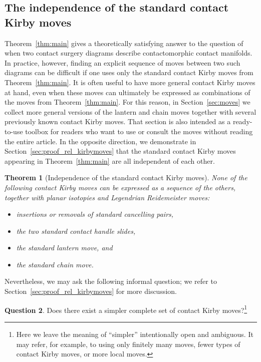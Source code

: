 \documentclass{amsart}
\numberwithin{equation}{section}
\numberwithin{figure}{section}
\newtheorem{theorem}{Theorem}[section]
\theoremstyle{definition}
\newtheorem{question}[theorem]{Question}
\theoremstyle{remark}
\begin{document}

\subsection{The independence of the standard contact Kirby moves}\label{sec:relation_moves}

Theorem~\ref{thm:main} gives a theoretically satisfying answer to the question of when two contact surgery diagrams describe contactomorphic contact manifolds. In practice, however, finding an explicit sequence of moves between two such diagrams can be difficult if one uses only the standard contact Kirby moves from Theorem~\ref{thm:main}. It is often useful to have more general contact Kirby moves at hand, even when these moves can ultimately be expressed as combinations of the moves from Theorem~\ref{thm:main}. For this reason, in Section~\ref{sec:moves} we collect more general versions of the lantern and chain moves together with several previously known contact Kirby moves. That section is also intended as a ready-to-use toolbox for readers who want to use or consult the moves without reading the entire article.
In the opposite direction, we demonstrate in Section~\ref{sec:proof_rel_kirbymoves} that the standard contact Kirby moves appearing in Theorem~\ref{thm:main} are all independent of each other.

\begin{theorem}[Independence of the standard contact Kirby moves]\label{thm:indep}
None of the following contact Kirby moves can be expressed as a sequence of the others, together with planar isotopies and Legendrian Reidemeister moves:
\begin{itemize}
    \item insertions or removals of standard cancelling pairs,
    \item the two standard contact handle slides,
    \item the standard lantern move, and
    \item  the standard chain move.
\end{itemize}
\end{theorem}

Nevertheless, we may ask the following informal question; we refer to Section~\ref{sec:proof_rel_kirbymoves} for more discussion.

\begin{question}
Does there exist a simpler complete set of contact Kirby moves?\footnote{Here we leave the meaning of ``simpler'' intentionally open and ambiguous. It may refer, for example, to using only finitely many moves, fewer types of contact Kirby moves, or more local moves.}
\end{question}
\end{document}
